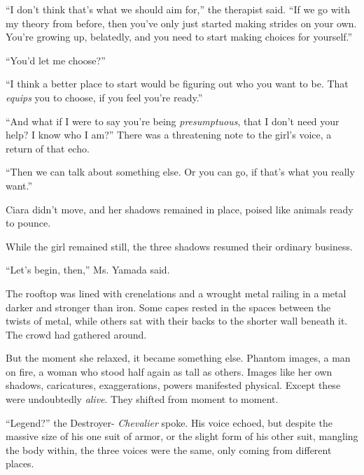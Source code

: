 ``I don't think that's what we should aim for,'' the therapist said.  ``If we go with my theory from before, then you've only just started making strides on your own.  You're growing up, belatedly, and you need to start making choices for yourself.''



``You'd let me choose?''



``I think a better place to start would be figuring out who you want to be.  That \emph{equips} you to choose, if you feel you're ready.''



``And what if I were to say you're being \emph{presumptuous}, that I don't need your help?  I know who I am?''  There was a threatening note to the girl's voice, a return of that echo.



``Then we can talk about something else.  Or you can go, if that's what you really want.''



Ciara didn't move, and her shadows remained in place, poised like animals ready to pounce.



While the girl remained still, the three shadows resumed their ordinary business.



``Let's begin, then,'' Ms. Yamada said.



\blacksquare



The rooftop was lined with crenelations and a wrought metal railing in a metal darker and stronger than iron.  Some capes rested in the spaces between the twists of metal, while others sat with their backs to the shorter wall beneath it.  The crowd had gathered around.



But the moment she relaxed, it became something else.  Phantom images, a man on fire, a woman who stood half again as tall as others.  Images like her own shadows, caricatures, exaggerations, powers manifested physical.  Except these were undoubtedly \emph{alive}.  They shifted from moment to moment.



``Legend?'' the Destroyer- \emph{Chevalier} spoke.  His voice echoed, but despite the massive size of his one suit of armor, or the slight form of his other suit, mangling the body within, the three voices were the same, only coming from different places.



